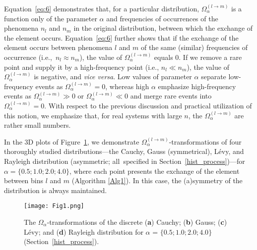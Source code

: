 \documentclass[entropy,article,accept,moreauthors,pdftex,10pt,a4paper]{mdpi}
\begin{document}
Equation~\eqref{eq:6} demonstrates that, for a particular distribution, $\Omega_\alpha^{(l \rightarrow m)}$ is a function only of the parameter $\alpha$ and frequencies of occurrences of the phenomena $n_l$ and $n_m$ in the original distribution, between which the exchange of the element occurs.
Equation~\eqref{eq:6} further shows that if the exchange of the element occurs between phenomena $l$ and $m$ of the same (similar) frequencies of occurrence (i.e.,~$n_l \approx n_m$), the value of $\Omega_\alpha^{(l \rightarrow m)}$ equals 0. If we remove a rare point and supply it by a high-frequency point (i.e., $n_l \ll n_m$), the value of $\Omega_\alpha^{(l \rightarrow m)}$ is negative, and \textit{vice versa}. Low values of parameter $\alpha$ separate low-frequency events as $\Omega_\alpha^{(l \rightarrow m)} = 0$, whereas high $\alpha$ emphasize high-frequency events as $\Omega_\alpha^{(l \rightarrow m)} \gg 0$ or $\Omega_\alpha^{(l \rightarrow m)} \ll 0$ and merge rare events into $\Omega_\alpha^{(l \rightarrow m)} = 0$. With respect to the previous discussion and practical utilization of this notion, we emphasize that, for real systems with large $n$, the $\Omega_\alpha^{(l \rightarrow m)}$ are rather small numbers.

In the 3D plots of Figure~\ref{Fig1}, we demonstrate $\Omega_\alpha^{(l \rightarrow m)}$-transformations of four thoroughly studied distributions---the Cauchy, Gauss (symmetrical), L\'{e}vy, and Rayleigh distribution (asymmetric; all~specified in Section~\ref{hist_process})---for $\alpha = \{0.5; 1.0; 2.0; 4.0\}$, where each point presents the exchange of the element between bins $l$ and $m$ (Algorithm \ref{Alg1}). In this case, the (a)symmetry of the distribution is always maintained.

\begin{figure}[H]
\centering
\texttt{[image: Fig1.png]}
\caption[]{The $\Omega_\alpha$-{transformations of the discrete} (\textbf{a}) Cauchy; (\textbf{b}) Gauss; (\textbf{c}) L\'{e}vy; and (\textbf{d}) Rayleigh distribution for $\alpha$ = $\{0.5; 1.0; 2.0; 4.0\}$ (Section~\ref{hist_process}).}
\label{Fig1}
\end{figure}
\end{document}
